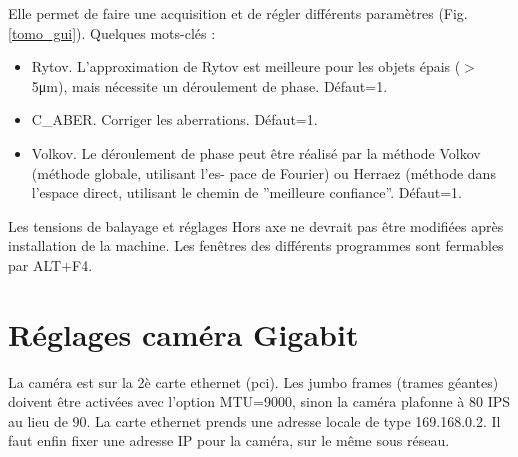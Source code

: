 \documentclass[	french,DIV=calc,%
							paper=a4,%
							fontsize=11pt,%
							twocolumn]{scrartcl}	 					%
\begin{document}
Elle permet de faire une acquisition et de régler différents paramètres (Fig. \ref{tomo_gui}).
Quelques mots-clés : 

\begin{itemize}
	\item Rytov. L’approximation de Rytov est
	meilleure pour les objets épais ($>$5μm), mais
	nécessite un déroulement de phase. Défaut=1.
	\item C\_ABER. Corriger les aberrations. Défaut=1.
	\item Volkov. Le déroulement de phase peut être réalisé par
	la méthode Volkov (méthode globale, utilisant l’es-
	pace de Fourier) ou Herraez (méthode dans l’espace
	direct, utilisant le chemin de ”meilleure confiance”.  Défaut=1.
	\end{itemize}

Les tensions de balayage et réglages Hors axe ne devrait pas être modifiées après installation de la machine. 
Les fenêtres des différents programmes sont fermables par ALT+F4.
\section{Réglages caméra Gigabit}

La caméra est sur la 2è carte ethernet (pci). Les jumbo frames (trames géantes) doivent
être activées avec l’option MTU=9000, sinon la caméra
plafonne à 80 IPS au lieu de 90. La carte ethernet
prends une adresse locale de type 169.168.0.2. Il
faut enfin fixer une adresse IP pour la caméra, sur le même sous réseau.
\end{document}
